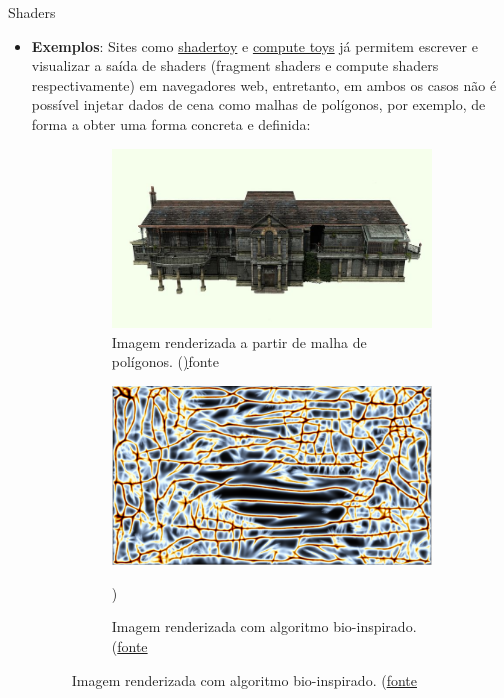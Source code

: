 \documentclass[2pt]{beamer} %
\begin{document}
\begin{frame}{Shaders}
\begin{itemize}
    \item \textbf{Exemplos}: Sites como \href{https://www.shadertoy.com/}{shadertoy} e \href{https://compute.toys/}{compute toys} já permitem escrever e visualizar a saída de shaders (fragment shaders e compute shaders respectivamente) em navegadores web, entretanto, em ambos os casos não é possível injetar dados de cena como malhas de polígonos, por exemplo, de forma a obter uma forma concreta e definida:
\begin{figure}
    \centering
    \begin{subfigure}[b]{0.2\textwidth}
        \includegraphics[width=\linewidth]{imgs/image.png}
        \caption{Imagem renderizada a partir de malha de polígonos. (\href{https://www.pinterest.com/pin/spencer-mansion--12807180169849484}){fonte}}
        \label{fig:mesh-polygon}
    \end{subfigure}
    \hspace{0.1\textwidth}
    \begin{subfigure}[b]{0.2\textwidth}
        \includegraphics[width=\linewidth]{imgs/physarum.png}
        \caption{Imagem renderizada com algoritmo bio-inspirado. (\href{https://www.shadertoy.com/view/tlKGDh}{fonte}})
        \label{fig:physarum}
    \end{subfigure}
    \label{fig:sdl-images}
\end{figure}

\end{itemize}
\end{frame}
\end{document}
